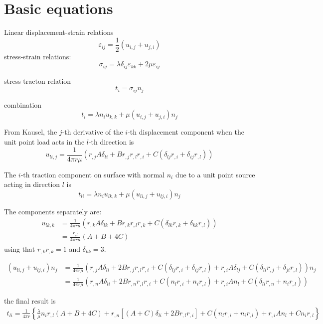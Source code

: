 \documentclass{article}
\begin{document}
\section{Basic equations}

Linear displacement-strain relations
%
\begin{equation}
\varepsilon_{ij} = \frac{1}{2} \left(u_{i,j} + u_{j,i}\right)
\end{equation}
%
stress-strain relations:
%
\begin{equation}
\sigma_{ij} = \lambda \delta_{ij} \varepsilon_{kk} + 2 \mu \varepsilon_{ij}
\end{equation}

stress-tracton relation
%
\begin{equation}
t_i = \sigma_{ij} n_j
\end{equation}

combination
\begin{equation}
t_i = \lambda n_i u_{k,k} + \mu \left( u_{i,j} + u_{j,i} \right) n_j
\end{equation}

From Kausel, the $j$-th derivative of the $i$-th displacement component when the unit point load acts in the $l$-th direction is
%
\begin{equation}
u_{li,j} = \frac{1}{4\pi r\mu} \left(
r_{,j} A \delta_{li}
+
B r_{,j} r_{,l} r_{,i}
+
C \left(\delta_{lj} r_{,i} + \delta_{ij} r_{,l} \right)
\right)
\end{equation}



The $i$-th traction component on surface with normal $n_i$ due to a unit point source acting in direction $l$ is
%
\begin{equation}
t_{li} = \lambda n_i u_{lk,k} + \mu \left( u_{li,j} + u_{lj,i} \right) n_j
\end{equation}

The components separately are:
%
\begin{align}
u_{lk,k} &= \frac{1}{4\pi r\mu} \left(
r_{,k} A \delta_{lk}
+
B r_{,k} r_{,l} r_{,k}
+
C \left(\delta_{lk} r_{,k} + \delta_{kk} r_{,l} \right)
\right) \nonumber \\
&= \frac{r_{,l}}{4\pi r\mu} \left( A + B + 4C \right)
\end{align}
%
using that $r_{,k} r_{,k} = 1$ and $\delta_{kk} = 3$.

\begin{align}
\left(u_{li,j} + u_{lj,i}\right) n_j
&=
\frac{1}{4\pi r\mu} \left(
r_{,j} A \delta_{li}
+
2B r_{,j} r_{,l} r_{,i}
+
C \left(\delta_{lj} r_{,i} + \delta_{ij} r_{,l} \right)
+
r_{,i} A \delta_{lj}
+
C \left(\delta_{li} r_{,j} + \delta_{ji} r_{,l} \right)
\right) n_j \nonumber \\
&=
\frac{1}{4\pi r\mu} \left(
r_{,n} A \delta_{li}
+
2B r_{,n} r_{,l} r_{,i}
+
C \left(n_l r_{,i} + n_i r_{,l} \right)
+
r_{,i} A n_l
+
C \left(\delta_{li} r_{,n} + n_i r_{,l} \right)
\right)
\end{align}

the final result is
%
\begin{align}
t_{li}
=
\frac{1}{4\pi r} 
\left\{
\frac{\lambda}{\mu}
n_i r_{,l} \left( A + B + 4C \right)
+
r_{,n}
\left[(A + C) \delta_{li}
+
2B r_{,l} r_{,i}
\right]
+
C \left(n_l r_{,i} + n_i r_{,l} \right)
+
r_{,i} A n_l
+
C n_i r_{,l}
\right\}
\end{align}
\end{document}
